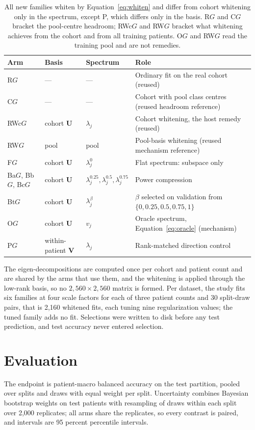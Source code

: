 \documentclass[11pt]{article}
\begin{document}
\begin{table}[htbp]
\centering
\renewcommand{\arraystretch}{1.15}
\begin{tabularx}{\textwidth}{@{}lllY@{}}
\toprule
Arm & Basis & Spectrum & Role \\
\midrule
R$G$ & --- & --- & Ordinary fit on the real cohort (reused) \\
C$G$ & --- & --- & Cohort with pool class centres (reused headroom reference) \\
RWc$G$ & cohort $\mathbf U$ & $\lambda_j$ & Cohort whitening, the host remedy (reused) \\
RW$G$ & pool & pool & Pool-basis whitening (reused mechanism reference) \\
F$G$ & cohort $\mathbf U$ & $\lambda_j^0$ & Flat spectrum: subspace only \\
Ba$G$, Bb$G$, Bc$G$ & cohort $\mathbf U$ & $\lambda_j^{0.25},\lambda_j^{0.5},\lambda_j^{0.75}$ & Power compression \\
Bt$G$ & cohort $\mathbf U$ & $\lambda_j^{\beta}$ & $\beta$ selected on validation from $\{0,0.25,0.5,0.75,1\}$ \\
O$G$ & cohort $\mathbf U$ & $v_j$ & Oracle spectrum, Equation~\ref{eq:oracle} (mechanism) \\
P$G$ & within-patient $\mathbf V$ & $\lambda_j$ & Rank-matched direction control \\
\bottomrule
\end{tabularx}
\caption{All new families whiten by Equation~\ref{eq:whiten} and differ from cohort whitening only in the spectrum, except P, which differs only in the basis. R$G$ and C$G$ bracket the pool-centre headroom; RWc$G$ and RW$G$ bracket what whitening achieves from the cohort and from all training patients. O$G$ and RW$G$ read the training pool and are not remedies.}
\label{tab:arms}
\end{table}

\noindent The eigen-decompositions are computed once per cohort and patient count and are shared by the arms that use them, and the whitening is applied through the low-rank basis, so no $2{,}560\times2{,}560$ matrix is formed. Per dataset, the study fits six families at four scale factors for each of three patient counts and 30 split-draw pairs, that is 2,160 whitened fits, each tuning nine regularization values; the tuned family adds no fit. Selections were written to disk before any test prediction, and test accuracy never entered selection.

\section{Evaluation}
\label{sec:evaluation}
The endpoint is patient-macro balanced accuracy on the test partition, pooled over splits and draws with equal weight per split. Uncertainty combines Bayesian bootstrap weights on test patients \citep{rubin1981bayesian} with resampling of draws within each split over 2,000 replicates; all arms share the replicates, so every contrast is paired, and intervals are 95 percent percentile intervals.
\end{document}
